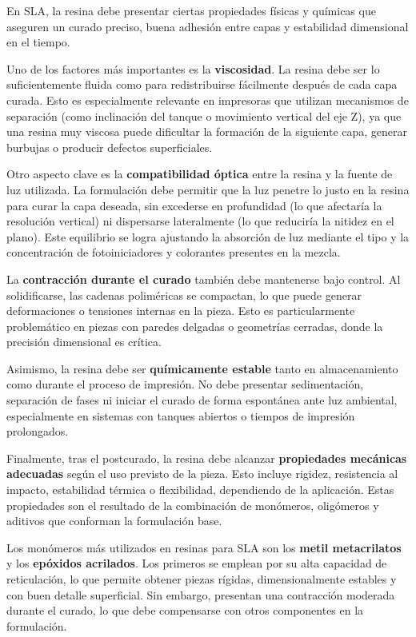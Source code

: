 En SLA, la resina debe presentar ciertas propiedades físicas y químicas que aseguren un curado preciso, buena adhesión entre capas y estabilidad dimensional en el tiempo.

Uno de los factores más importantes es la \textbf{viscosidad}. La resina debe ser lo suficientemente fluida como para redistribuirse fácilmente después de cada capa curada. Esto es especialmente relevante en impresoras que utilizan mecanismos de separación (como inclinación del tanque o movimiento vertical del eje Z), ya que una resina muy viscosa puede dificultar la formación de la siguiente capa, generar burbujas o producir defectos superficiales.

Otro aspecto clave es la \textbf{compatibilidad óptica} entre la resina y la fuente de luz utilizada. La formulación debe permitir que la luz penetre lo justo en la resina para curar la capa deseada, sin excederse en profundidad (lo que afectaría la resolución vertical) ni dispersarse lateralmente (lo que reduciría la nitidez en el plano). Este equilibrio se logra ajustando la absorción de luz mediante el tipo y la concentración de fotoiniciadores y colorantes presentes en la mezcla.

La \textbf{contracción durante el curado} también debe mantenerse bajo control. Al solidificarse, las cadenas poliméricas se compactan, lo que puede generar deformaciones o tensiones internas en la pieza. Esto es particularmente problemático en piezas con paredes delgadas o geometrías cerradas, donde la precisión dimensional es crítica.

Asimismo, la resina debe ser \textbf{químicamente estable} tanto en almacenamiento como durante el proceso de impresión. No debe presentar sedimentación, separación de fases ni iniciar el curado de forma espontánea ante luz ambiental, especialmente en sistemas con tanques abiertos o tiempos de impresión prolongados.

Finalmente, tras el postcurado, la resina debe alcanzar \textbf{propiedades mecánicas adecuadas} según el uso previsto de la pieza. Esto incluye rigidez, resistencia al impacto, estabilidad térmica o flexibilidad, dependiendo de la aplicación. Estas propiedades son el resultado de la combinación de monómeros, oligómeros y aditivos que conforman la formulación base.

Los monómeros más utilizados en resinas para SLA son los \textbf{metil metacrilatos} y los \textbf{epóxidos acrilados}. Los primeros se emplean por su alta capacidad de reticulación, lo que permite obtener piezas rígidas, dimensionalmente estables y con buen detalle superficial. Sin embargo, presentan una contracción moderada durante el curado, lo que debe compensarse con otros componentes en la formulación.

